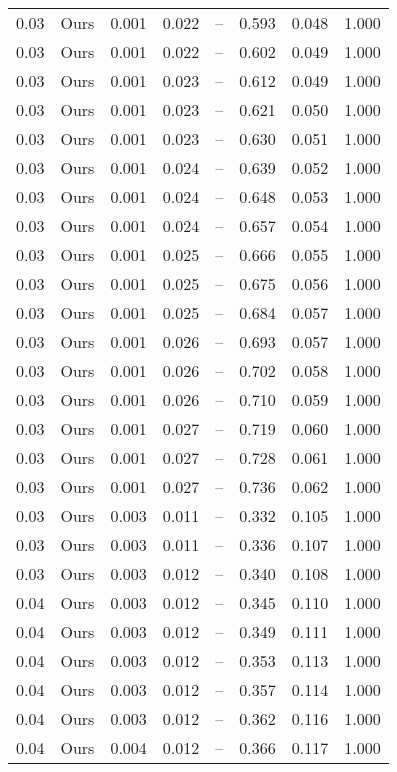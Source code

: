 \begin{table}[H]
\begin{tabular}{l c l l l}
0.03 & Ours & 0.001 & 0.022 & -- & 0.593 & 0.048 & 1.000 \\
0.03 & Ours & 0.001 & 0.022 & -- & 0.602 & 0.049 & 1.000 \\
0.03 & Ours & 0.001 & 0.023 & -- & 0.612 & 0.049 & 1.000 \\
0.03 & Ours & 0.001 & 0.023 & -- & 0.621 & 0.050 & 1.000 \\
0.03 & Ours & 0.001 & 0.023 & -- & 0.630 & 0.051 & 1.000 \\
0.03 & Ours & 0.001 & 0.024 & -- & 0.639 & 0.052 & 1.000 \\
0.03 & Ours & 0.001 & 0.024 & -- & 0.648 & 0.053 & 1.000 \\
0.03 & Ours & 0.001 & 0.024 & -- & 0.657 & 0.054 & 1.000 \\
0.03 & Ours & 0.001 & 0.025 & -- & 0.666 & 0.055 & 1.000 \\
0.03 & Ours & 0.001 & 0.025 & -- & 0.675 & 0.056 & 1.000 \\
0.03 & Ours & 0.001 & 0.025 & -- & 0.684 & 0.057 & 1.000 \\
0.03 & Ours & 0.001 & 0.026 & -- & 0.693 & 0.057 & 1.000 \\
0.03 & Ours & 0.001 & 0.026 & -- & 0.702 & 0.058 & 1.000 \\
0.03 & Ours & 0.001 & 0.026 & -- & 0.710 & 0.059 & 1.000 \\
0.03 & Ours & 0.001 & 0.027 & -- & 0.719 & 0.060 & 1.000 \\
0.03 & Ours & 0.001 & 0.027 & -- & 0.728 & 0.061 & 1.000 \\
0.03 & Ours & 0.001 & 0.027 & -- & 0.736 & 0.062 & 1.000 \\
0.03 & Ours & 0.003 & 0.011 & -- & 0.332 & 0.105 & 1.000 \\
0.03 & Ours & 0.003 & 0.011 & -- & 0.336 & 0.107 & 1.000 \\
0.03 & Ours & 0.003 & 0.012 & -- & 0.340 & 0.108 & 1.000 \\
0.04 & Ours & 0.003 & 0.012 & -- & 0.345 & 0.110 & 1.000 \\
0.04 & Ours & 0.003 & 0.012 & -- & 0.349 & 0.111 & 1.000 \\
0.04 & Ours & 0.003 & 0.012 & -- & 0.353 & 0.113 & 1.000 \\
0.04 & Ours & 0.003 & 0.012 & -- & 0.357 & 0.114 & 1.000 \\
0.04 & Ours & 0.003 & 0.012 & -- & 0.362 & 0.116 & 1.000 \\
0.04 & Ours & 0.004 & 0.012 & -- & 0.366 & 0.117 & 1.000 \\

\end{tabular}
\end{table}
